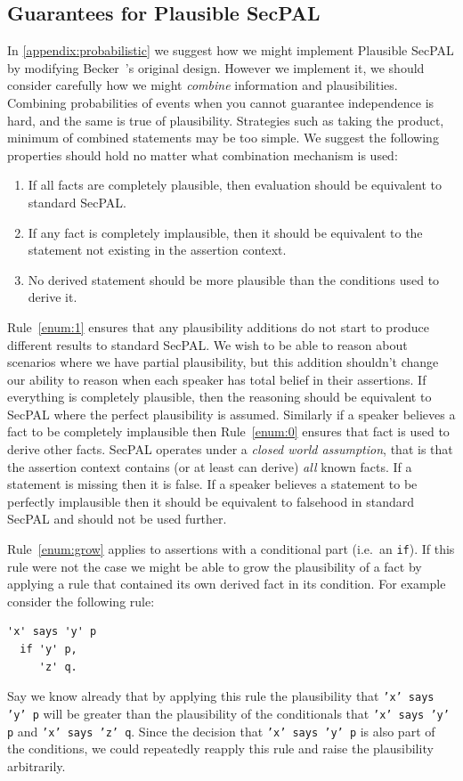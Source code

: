 \documentclass[thesis.tex]{subfiles}
\begin{document}
\subsection{Guarantees for Plausible SecPAL} 

In \autoref{appendix:probabilistic} we suggest how we might implement Plausible
SecPAL by modifying Becker~\etal's original design. However we implement it, we
should consider carefully how we might \emph{combine} information and
plausibilities. Combining probabilities of events when you cannot guarantee
independence is hard, and the same is true of plausibility. Strategies such as
taking the product, minimum of combined statements may be too simple. We suggest
the following properties should hold no matter what combination mechanism is
used:

\begin{enumerate}
\item \label{enum:1} If all facts are completely plausible, then evaluation should be
  equivalent to standard SecPAL.
\item \label{enum:0} If any fact is completely  implausible, then it should be equivalent
  to the statement not existing in the assertion context.
\item \label{enum:grow} No derived statement should be more plausible than the conditions used
  to derive it.
\end{enumerate}

Rule~\ref{enum:1} ensures that any plausibility additions do not start to
produce different results to standard SecPAL. We wish to be able to reason about
scenarios where we have partial plausibility, but this addition shouldn't change
our ability to reason when each speaker has total belief in their assertions. If
everything is completely plausible, then the reasoning should be equivalent to
SecPAL where the perfect plausibility is assumed. Similarly if a speaker
believes a fact to be completely implausible then Rule~\ref{enum:0} ensures that
fact is used to derive other facts. SecPAL operates under a \emph{closed world
assumption}, that is that the assertion context contains (or at least can
derive) \emph{all} known facts. If a statement is missing then it is false. If a
speaker believes a statement to be perfectly implausible then it should be
equivalent to falsehood in standard SecPAL and should not be used further.

Rule~\ref{enum:grow} applies to assertions with a conditional part (i.e.~an
\texttt{if}). If this rule were not the case we might be able to grow the
plausibility of a fact by applying a rule that contained its own derived fact in
its condition. For example consider the following rule:
\begin{lstlisting}
'x' says 'y' p
  if 'y' p,
     'z' q.
\end{lstlisting} Say we know already that by applying this rule the plausibility
that \texttt{'x' says 'y' p} will be greater than the plausibility of the
conditionals that \texttt{'x' says 'y' p} and \texttt{'x' says 'z' q}. Since the
decision that \texttt{'x' says 'y' p} is also part of the conditions, we could
repeatedly reapply this rule and raise the plausibility arbitrarily.
\end{document}
